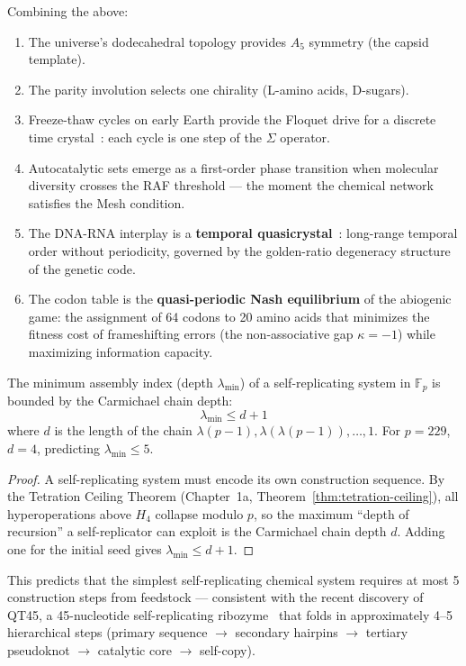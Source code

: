 Combining the above:
\begin{enumerate}
    \item The universe's dodecahedral topology provides $A_5$ symmetry (the capsid template).
    \item The parity involution selects one chirality (L-amino acids, D-sugars).
    \item Freeze-thaw cycles on early Earth provide the Floquet drive for a discrete time crystal~\cite{wilczek2012, yao2017}: each cycle is one step of the $\Sigma$ operator.
    \item Autocatalytic sets emerge as a first-order phase transition when molecular diversity crosses the RAF threshold --- the moment the chemical network satisfies the Mesh condition.
    \item The DNA-RNA interplay is a \textbf{temporal quasicrystal}~\cite{penrose1974, schrodinger1944}: long-range temporal order without periodicity, governed by the golden-ratio degeneracy structure of the genetic code.
    \item The codon table is the \textbf{quasi-periodic Nash equilibrium} of the abiogenic game: the assignment of 64 codons to 20 amino acids that minimizes the fitness cost of frameshifting errors (the non-associative gap $\kappa = -1$) while maximizing information capacity.
\end{enumerate}

\begin{theorem}\label{thm:abiogenic-depth}
The minimum assembly index (depth $\lambda_{\min}$) of a self-replicating system in $\mathbb{F}_p$ is bounded by the Carmichael chain depth:
$$\lambda_{\min} \leq d + 1$$
where $d$ is the length of the chain $\lambda(p-1), \lambda(\lambda(p-1)), \ldots, 1$. For $p = 229$, $d = 4$, predicting $\lambda_{\min} \leq 5$.
\end{theorem}

\begin{proof}
A self-replicating system must encode its own construction sequence. By the Tetration Ceiling Theorem (Chapter~1a, Theorem~\ref{thm:tetration-ceiling}), all hyperoperations above $H_4$ collapse modulo $p$, so the maximum ``depth of recursion'' a self-replicator can exploit is the Carmichael chain depth $d$. Adding one for the initial seed gives $\lambda_{\min} \leq d + 1$. \qedhere
\end{proof}

This predicts that the simplest self-replicating chemical system requires at most 5 construction steps from feedstock --- consistent with the recent discovery of QT45, a 45-nucleotide self-replicating ribozyme~\cite{qt45_2026} that folds in approximately 4--5 hierarchical steps (primary sequence $\to$ secondary hairpins $\to$ tertiary pseudoknot $\to$ catalytic core $\to$ self-copy).

